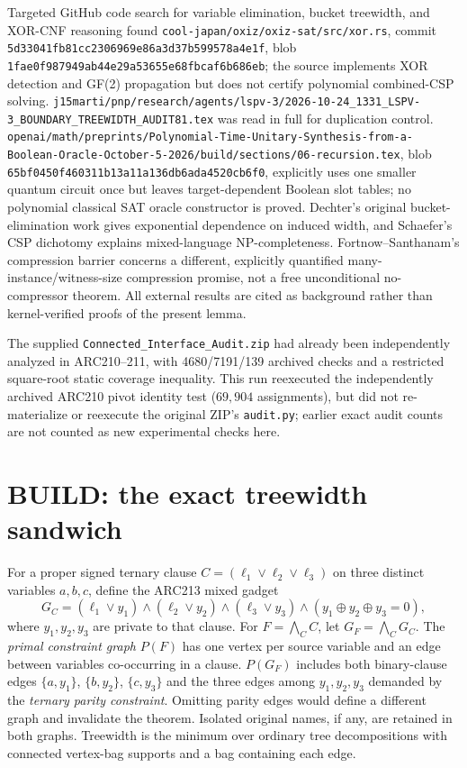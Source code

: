 \documentclass[11pt]{article}
\begin{document}
Targeted GitHub code search for variable elimination, bucket treewidth, and XOR-CNF reasoning found \texttt{cool-japan/oxiz/oxiz-sat/src/xor.rs}, commit \texttt{5d33041fb81cc2306969e86a3d37b599578a4e1f}, blob \texttt{1fae0f987949ab44e29a53655e68fbcaf6b686eb}; the source implements XOR detection and GF(2) propagation but does not certify polynomial combined-CSP solving. \texttt{j15marti/pnp/research/agents/lspv-3/2026-10-24\_1331\_LSPV-3\_BOUNDARY\_TREEWIDTH\_AUDIT81.tex} was read in full for duplication control. \texttt{openai/math/preprints/Polynomial-Time-Unitary-Synthesis-from-a-Boolean-Oracle-October-5-2026/build/sections/06-recursion.tex}, blob \texttt{65bf0450f460311b13a11a136db6ada4520cb6f0}, explicitly uses one smaller quantum circuit once but leaves target-dependent Boolean slot tables; no polynomial classical SAT oracle constructor is proved. Dechter's original bucket-elimination work gives exponential dependence on induced width, and Schaefer's CSP dichotomy explains mixed-language NP-completeness. Fortnow--Santhanam's compression barrier concerns a different, explicitly quantified many-instance/witness-size compression promise, not a free unconditional no-compressor theorem. All external results are cited as background rather than kernel-verified proofs of the present lemma.

The supplied \texttt{Connected\_Interface\_Audit.zip} had already been independently analyzed in ARC210--211, with 4680/7191/139 archived checks and a restricted square-root static coverage inequality. This run reexecuted the independently archived ARC210 pivot identity test ($69{,}904$ assignments), but did not re-materialize or reexecute the original ZIP's \texttt{audit.py}; earlier exact audit counts are not counted as new experimental checks here.

\section{BUILD: the exact treewidth sandwich}
For a proper signed ternary clause $C=(\ell_1\vee\ell_2\vee\ell_3)$ on three distinct variables $a,b,c$, define the ARC213 mixed gadget
\[
 G_C=(\ell_1\vee y_1)\wedge(\ell_2\vee y_2)\wedge(\ell_3\vee y_3)
 \wedge(y_1\oplus y_2\oplus y_3=0),
\]
where $y_1,y_2,y_3$ are private to that clause. For $F=\bigwedge_C C$, let $G_F=\bigwedge_C G_C$. The \emph{primal constraint graph} $P(F)$ has one vertex per source variable and an edge between variables co-occurring in a clause. $P(G_F)$ includes both binary-clause edges $\{a,y_1\}$, $\{b,y_2\}$, $\{c,y_3\}$ and the three edges among $y_1,y_2,y_3$ demanded by the \emph{ternary parity constraint}. Omitting parity edges would define a different graph and invalidate the theorem. Isolated original names, if any, are retained in both graphs. Treewidth is the minimum over ordinary tree decompositions with connected vertex-bag supports and a bag containing each edge.
\end{document}
